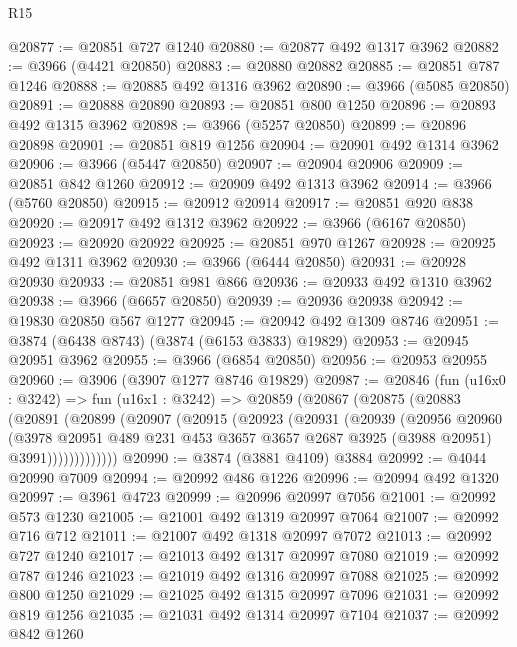 \begin{lexlean}{R15}
\begin{coremodule}
@20877 := @20851 @727 @1240
@20880 := @20877 @492 @1317 @3962
@20882 := @3966 (@4421 @20850)
@20883 := @20880 @20882
@20885 := @20851 @787 @1246
@20888 := @20885 @492 @1316 @3962
@20890 := @3966 (@5085 @20850)
@20891 := @20888 @20890
@20893 := @20851 @800 @1250
@20896 := @20893 @492 @1315 @3962
@20898 := @3966 (@5257 @20850)
@20899 := @20896 @20898
@20901 := @20851 @819 @1256
@20904 := @20901 @492 @1314 @3962
@20906 := @3966 (@5447 @20850)
@20907 := @20904 @20906
@20909 := @20851 @842 @1260
@20912 := @20909 @492 @1313 @3962
@20914 := @3966 (@5760 @20850)
@20915 := @20912 @20914
@20917 := @20851 @920 @838
@20920 := @20917 @492 @1312 @3962
@20922 := @3966 (@6167 @20850)
@20923 := @20920 @20922
@20925 := @20851 @970 @1267
@20928 := @20925 @492 @1311 @3962
@20930 := @3966 (@6444 @20850)
@20931 := @20928 @20930
@20933 := @20851 @981 @866
@20936 := @20933 @492 @1310 @3962
@20938 := @3966 (@6657 @20850)
@20939 := @20936 @20938
@20942 := @19830 @20850 @567 @1277
@20945 := @20942 @492 @1309 @8746
@20951 := @3874 (@6438 @8743) (@3874 (@6153 @3833) @19829)
@20953 := @20945 @20951 @3962
@20955 := @3966 (@6854 @20850)
@20956 := @20953 @20955
@20960 := @3906 (@3907 @1277 @8746 @19829)
@20987 := @20846
    (fun (u16x0 : @3242) =>
    fun (u16x1 : @3242) =>
    @20859
      (@20867
        (@20875
          (@20883
            (@20891
              (@20899
                (@20907
                  (@20915
                    (@20923
                      (@20931
                        (@20939
                          (@20956
                            @20960
                            (@3978
                              @20951
                              @489
                              @231
                              @453
                              @3657
                              @3657
                              @2687
                              @3925
                              (@3988 @20951)
                              @3991)))))))))))))
@20990 := @3874 (@3881 @4109) @3884
@20992 := @4044 @20990 @7009
@20994 := @20992 @486 @1226
@20996 := @20994 @492 @1320
@20997 := @3961 @4723
@20999 := @20996 @20997 @7056
@21001 := @20992 @573 @1230
@21005 := @21001 @492 @1319 @20997 @7064
@21007 := @20992 @716 @712
@21011 := @21007 @492 @1318 @20997 @7072
@21013 := @20992 @727 @1240
@21017 := @21013 @492 @1317 @20997 @7080
@21019 := @20992 @787 @1246
@21023 := @21019 @492 @1316 @20997 @7088
@21025 := @20992 @800 @1250
@21029 := @21025 @492 @1315 @20997 @7096
@21031 := @20992 @819 @1256
@21035 := @21031 @492 @1314 @20997 @7104
@21037 := @20992 @842 @1260

\end{coremodule}
\end{lexlean}
